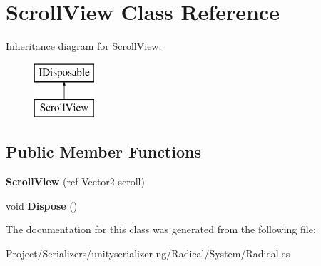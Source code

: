 \hypertarget{class_scroll_view}{}\section{Scroll\+View Class Reference}
\label{class_scroll_view}
Inheritance diagram for Scroll\+View\+:\begin{figure}[H]
\begin{center}
\leavevmode
\includegraphics[height=2.000000cm]{class_scroll_view}
\end{center}
\end{figure}
\subsection*{Public Member Functions}
\begin{DoxyCompactItemize}
\item 
\mbox{\label{class_scroll_view_ab2953e831d25c286008125c14cf3121b}} 
{\bfseries Scroll\+View} (ref Vector2 scroll)
\item 
\mbox{\label{class_scroll_view_a297facb4dc5f6f2698415506b53d1b87}} 
void {\bfseries Dispose} ()
\end{DoxyCompactItemize}


The documentation for this class was generated from the following file\+:\begin{DoxyCompactItemize}
\item 
Project/\+Serializers/unityserializer-\/ng/\+Radical/\+System/Radical.\+cs\end{DoxyCompactItemize}
